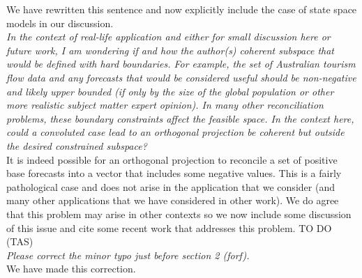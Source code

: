 \documentclass[a4paper,11pt]{article}
\begin{document}
    \noindent We have rewritten this sentence and now explicitly include the case of state space models in our discussion.\\
    
    
    \noindent\textit{In the context of real-life application and either for small discussion here or future work, I am wondering if and how the author(s) coherent subspace that would be defined with hard boundaries. For example, the set of Australian tourism flow data and any forecasts that would be considered useful should be non-negative and likely upper bounded (if only by the size of the global population or other more realistic subject matter expert opinion). In many other reconciliation problems, these boundary constraints affect the feasible space. In the context here, could a convoluted case lead to an orthogonal projection be coherent but outside the desired constrained subspace?}\\
    
    \noindent It is indeed possible for an orthogonal projection to reconcile a set of positive base forecasts into a vector that includes some negative values.  This is a fairly pathological case and does not arise in the application that we consider (and many other applications that we have considered in other work).  We do agree that this problem may arise in other contexts so we now include some discussion of this issue and cite some recent work that addresses this problem. TO DO (TAS)\\

    \noindent\textit{Please correct the minor typo just before section 2 (forf).}\\
    We have made this correction.\\
    
\end{document}
